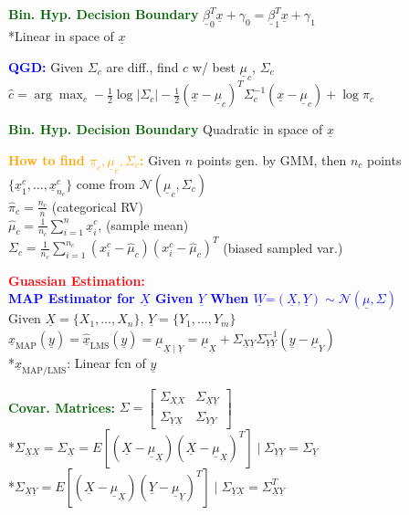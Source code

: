 \documentclass[5pt]{extarticle} %
\begin{document}
\begin{paracol}{3}
{    \textcolor{darkgreen}{\textbf{Bin. Hyp. Decision Boundary}} $\underline{\beta}_0^T \underline{x} + \gamma_0 = \underline{\beta}_1^T \underline{x} + \gamma_1$ \\
    *Linear in space of $\underline{x}$

    \textcolor{blue}{\textbf{QGD:}} Given $\Sigma_c$ are diff., find $c$ w/ best $\underline{\mu}_c$, $\Sigma_c$ \\
    $\hat{c} = \arg \max_c -\frac{1}{2} \log |\Sigma_c| - \frac{1}{2} (\underline{x} - \underline{\mu}_c)^T \Sigma_c^{-1} (\underline{x} - \underline{\mu}_c) + \log \pi_c$ \

    \textcolor{darkgreen}{\textbf{Bin. Hyp. Decision Boundary}} Quadratic in space of $\underline{x}$

    \textcolor{orange}{\textbf{How to find $\underline{\pi}_c, \underline{\mu}_c, \Sigma_c$:}} Given $n$ points gen. by GMM, then $n_c$ points $\{\underline{x}_1^c, \ldots, \underline{x}_{n_c}^c\}$ come from $\mathcal{N} (\underline{\mu}_c, \Sigma_c)$ \\
    $\hat{\pi}_c = \frac{n_c}{n}$ (categorical RV) \\
    $\hat{\mu}_c = \frac{1}{n_c} \sum_{i=1}^{n} \underline{x}_i^c$, (sample mean)\\
    $\Sigma_c = \frac{1}{n_c} \sum_{i=1}^{n_c} (x_i^c - \hat{\mu}_c)(x_i^c - \hat{\mu}_c)^T$ (biased sampled var.)

    \textcolor{red}{\textbf{Guassian Estimation:}} \\
    \textcolor{blue}{\textbf{MAP Estimator for $\underline{X}$ Given $\underline{Y}$ When $\underline{W} \text{=} (\underline{X},\underline{Y}) \sim \mathcal{N} (\underline{\mu}, \Sigma)$}} \\
    Given $\underline{X} = \{X_1,\ldots,X_n\}$, $\underline{Y} = \{Y_1,\ldots,Y_m\}$ \\ 
    $\hat{\underline{x}}_{\text{MAP}}(\underline{y}) = \hat{\underline{x}}_{\text{LMS}}(\underline{y}) = \underline{\mu}_{\underline{X} \mid \underline{Y}}= \underline{\mu}_{\underline{X}} + \Sigma_{\underline{X} \underline{Y}} \Sigma_{\underline{Y} \underline{Y}}^{-1} (\underline{y} - \underline{\mu}_Y)$ \\
    *$\hat{\underline{x}}_{\text{MAP/LMS}}$: Linear fcn of $\underline{y}$ 

    \textcolor{darkgreen}{\textbf{Covar. Matrices:}} $\Sigma = \begin{bmatrix} \Sigma_{\underline{XX}} & \Sigma_{\underline{X} \underline{Y}} \\ \Sigma_{\underline{Y} \underline{X}} & \Sigma_{\underline{YY}} \end{bmatrix}$ \\
    *$\Sigma_{\underline{X} \underline{X}} = \Sigma_{\underline{X}} = E\left[(\underline{X} - \underline{\mu}_{\underline{X}})(\underline{X} - \underline{\mu}_{\underline{X}})^T\right] \mid \Sigma_{\underline{Y} \underline{Y}} = \Sigma_{\underline{Y}}$ \\ 
    *$\Sigma_{\underline{X} \underline{Y}} = E\left[(\underline{X} - \underline{\mu}_{\underline{X}})(\underline{Y} - \underline{\mu}_{\underline{Y}})^T\right] \mid \Sigma_{\underline{Y} \underline{X}} = \Sigma_{\underline{X} \underline{Y}}^T$ 

}
\end{paracol}
\end{document}
